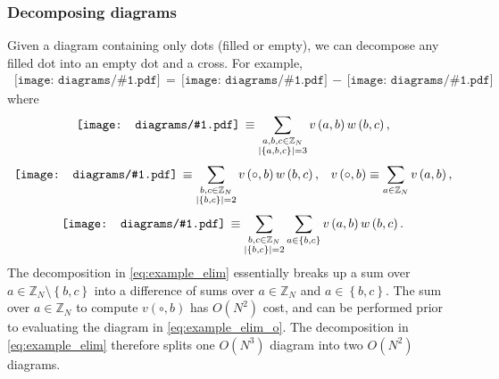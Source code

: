 \documentclass[nofootinbib,notitlepage,11pt]{revtex4-2}
\newcommand{\p}[1]{\left(#1\right)} %
\renewcommand{\set}[1]{\left\{#1\right\}} %
\newcommand{\1}{\mathds{1}}
\newcommand{\ZZ}{\mathbb{Z}}
\newcommand{\diagram}[1]
{\,\texttt{[image: diagrams/\#1.pdf]}\,}
\begin{document}
\subsubsection{Decomposing diagrams}

Given a diagram containing only dots (filled or empty), we can
decompose any filled dot into an empty dot and a cross.  For example,
\begin{align}
  \diagram{example_elim}
  = \diagram{example_elim_o}
  - \diagram{example_elim_x}
  \label{eq:example_elim}
\end{align}
where
\begin{align}
  \diagram{example_elim}
  \equiv \sum_{\substack{a,b,c\in\ZZ_N\\\abs{\set{a,b,c}}=3}}
  v\p{a,b} w\p{b,c},
\end{align}
\begin{align}
  \diagram{example_elim_o}
  \equiv \sum_{\substack{b,c\in\ZZ_N\\\abs{\set{b,c}}=2}}
  v\p{\circ,b} w\p{b,c},
  &&
  v\p{\circ,b} \equiv \sum_{a\in\ZZ_N} v\p{a,b},
  \label{eq:example_elim_o}
\end{align}
\begin{align}
  \diagram{example_elim_x}
  \equiv \sum_{\substack{b,c\in\ZZ_N\\\abs{\set{b,c}}=2}}
  \sum_{a\in\set{b,c}} v\p{a,b} w\p{b,c}.
\end{align}
The decomposition in \eqref{eq:example_elim} essentially breaks up a
sum over $a\in\ZZ_N\setminus\set{b,c}$ into a difference of sums over
$a\in\ZZ_N$ and $a\in\set{b,c}$.  The sum over $a\in\ZZ_N$ to compute
$v\p{\circ,b}$ has $O\p{N^2}$ cost, and can be performed prior to
evaluating the diagram in \eqref{eq:example_elim_o}.  The
decomposition in \eqref{eq:example_elim} therefore splits one
$O\p{N^3}$ diagram into two $O\p{N^2}$ diagrams.
\end{document}

